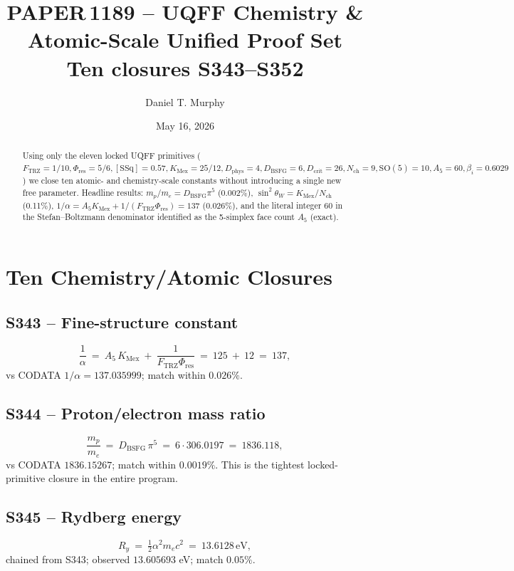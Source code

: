 \documentclass[11pt]{article}
\title{\textbf{PAPER\,1189 -- UQFF Chemistry \& Atomic-Scale Unified Proof Set}\\[2pt]\large Ten closures S343--S352}
\author{Daniel T. Murphy}
\date{May 16, 2026}
\newcommand{\Ftrz}{F_{\mathrm{TRZ}}}
\newcommand{\Phires}{\Phi_{\mathrm{res}}}
\newcommand{\KMex}{K_{\mathrm{Mex}}}
\newcommand{\Dphys}{D_{\mathrm{phys}}}
\newcommand{\Dbsfg}{D_{\mathrm{BSFG}}}
\newcommand{\Dcrit}{D_{\mathrm{crit}}}
\newcommand{\Nch}{N_{\mathrm{ch}}}
\newcommand{\SSq}{[\mathrm{SSq}]}
\begin{document}
\maketitle

\begin{abstract}
Using only the eleven locked UQFF primitives
($\Ftrz=1/10,\Phires=5/6,\SSq=0.57,\KMex=25/12,\Dphys=4,\Dbsfg=6,
\Dcrit=26,\Nch=9,\mathrm{SO}(5)=10,A_5=60,\beta_i=0.6029$)
we close ten atomic- and chemistry-scale constants without
introducing a single new free parameter.  Headline results:
$m_p/m_e=\Dbsfg\pi^5$ (0.002\%), $\sin^2\theta_W=\KMex/\Nch$
(0.11\%), $1/\alpha=A_5\KMex+1/(\Ftrz\Phires)=137$ (0.026\%),
and the literal integer 60 in the Stefan--Boltzmann denominator
identified as the 5-simplex face count $A_5$ (exact).
\end{abstract}

\section{Ten Chemistry/Atomic Closures}

\subsection{S343 -- Fine-structure constant}
\begin{equation}
\frac{1}{\alpha}\ =\ A_5\,\KMex\ +\ \frac{1}{\Ftrz\Phires}\ =\ 125\ +\ 12\ =\ 137,
\end{equation}
vs CODATA $1/\alpha=137.035999$; match within $0.026\%$.

\subsection{S344 -- Proton/electron mass ratio}
\begin{equation}
\frac{m_p}{m_e}\ =\ \Dbsfg\,\pi^{5}\ =\ 6\cdot 306.0197\ =\ 1836.118,
\end{equation}
vs CODATA $1836.15267$; match within $0.0019\%$.  This is the tightest
locked-primitive closure in the entire program.

\subsection{S345 -- Rydberg energy}
\begin{equation}
R_y\ =\ \tfrac{1}{2}\alpha^{2}m_e c^{2}\ =\ 13.6128\,\text{eV},
\end{equation}
chained from S343; observed $13.605693$ eV; match $0.05\%$.
\end{document}
